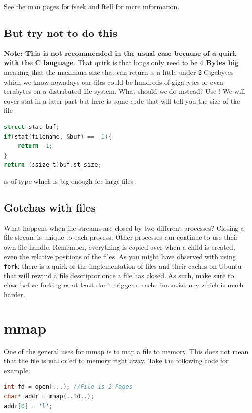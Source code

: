 See the man pages for fseek and ftell for more information.

\subsection{But try not to do this}

\textbf{Note: This is not recommended in the usual case because of a quirk with the C language}. That quirk is that longs only need to be \textbf{4 Bytes big} meaning that the maximum size that  can return is a little under 2 Gigabytes which we know nowadays our files could be hundreds of gigabytes or even terabytes on a distributed file system. What should we do instead? Use ! We will cover stat in a later part but here is some code that will tell you the size of the file

\begin{lstlisting}[language=C]
struct stat buf;
if(stat(filename, &buf) == -1){
    return -1;
}
return (ssize_t)buf.st_size;
\end{lstlisting}

 is of type  which is big enough for large files.

\subsection{Gotchas with files}

What happens when file streams are closed by two different processes? Closing a file stream is unique to each process. Other processes can continue to use their own file-handle. Remember, everything is copied over when a child is created, even the relative positions of the files. As you might have observed with using \texttt{fork}, there is a quirk of the implementation of files and their caches on Ubuntu that will rewind a file descriptor once a file has closed. As such, make sure to close before forking or at least don't trigger a cache inconsistency which is much harder.

\section{mmap}

One of the general uses for mmap is to map a file to memory. This does not mean that the file is malloc'ed to memory right away. Take the following code for example.

\begin{lstlisting}[language=C]
int fd = open(...); //File is 2 Pages
char* addr = mmap(..fd..);
addr[0] = 'l';
\end{lstlisting}

